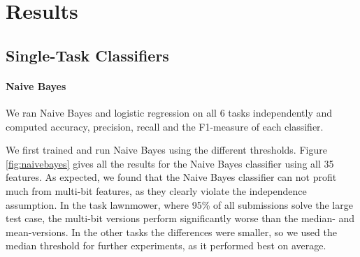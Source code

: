 \section{Results}
\subsection{Single-Task Classifiers}
\paragraph*{Naive Bayes}
We ran Naive Bayes and logistic regression on all 6 tasks independently and computed accuracy, precision, recall and the F1-measure of each classifier. 

We first trained and run Naive Bayes using the different thresholds. Figure \ref{fig:naivebayes} gives all the results for the Naive Bayes classifier using all 35 features. As expected, we found that the Naive Bayes classifier can not profit much from multi-bit features, as they clearly violate the independence assumption. In the task lawnmower, where 95\% of all submissions solve the large test case, the multi-bit versions perform significantly worse than the median- and mean-versions. In the other tasks the differences were smaller, so we used the median threshold for further experiments, as it performed best on average.


